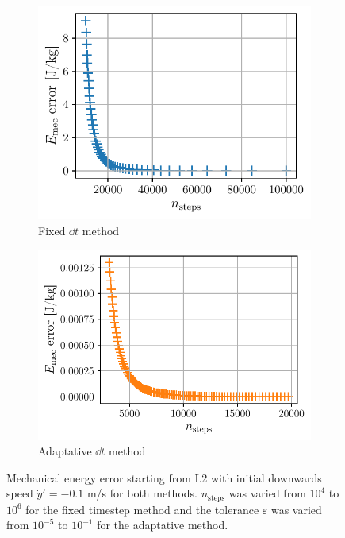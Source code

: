 \begin{figure}[H]
    \centering
    \begin{subfigure}{0.46\linewidth}
        \centering
        \includegraphics[width=\linewidth]{figures/lagrange_emec_error_fixed.pdf}
        \caption{Fixed \(\dd t\) method}
        \label{fig:lagrange_emec_error_fixed}
    \end{subfigure}
    \begin{subfigure}{0.52\linewidth}
        \centering
        \includegraphics[width=\linewidth]{figures/lagrange_emec_error_adapt.pdf}
        \caption{Adaptative \(\dd t\) method}
        \label{fig:lagrange_emec_error_adapt}
    \end{subfigure}
    \caption{Mechanical energy error starting from L2 with initial downwards speed \(\dot y' = -0.1\) m/s for both methods. \(n_\textrm{steps}\) was varied from \(10^4\) to \(10^6\) for the fixed timestep method and the tolerance \(\varepsilon\) was varied from \(10^{-5}\) to \(10^{-1}\) for the adaptative method.}
    \label{fig:lagrange_emec_error}
\end{figure}

